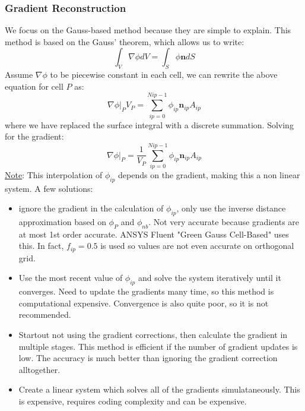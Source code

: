 \documentclass[11pt]{article}
\begin{document}
\subsubsection{Gradient Reconstruction}
\label{sec:orgfef4be6}
We focus on the Gauss-based method because they are simple to explain. This method is based on the Gauss'
theorem, which allows us to write:
\begin{equation*}
\int_{V} \nabla \phi dV = \int_{S} \phi \textbf{n} dS
\end{equation*}
Assume \(\nabla \phi\) to be piecewise constant in each cell, we can rewrite the above equation for cell
\(P\) as:
\begin{equation*}
\nabla \phi \biggr\rvert_P V_P = \sum_{ip=0}^{N{ip}-1} \phi_{ip}\textbf{n}_{ip}A_{ip}
\end{equation*}
where we have replaced the surface integral with a discrete summation. Solving for the gradient:
\begin{equation*}
\nabla \phi \biggr\rvert_P = \frac{1}{V_P}\sum_{ip=0}^{N{ip}-1} \phi_{ip}\textbf{n}_{ip}A_{ip}
\end{equation*}
\uline{Note}:
This interpolation of \(\phi_{ip}\) depends on the gradient, making this a non linear system.
A few solutions:
\begin{itemize}
\item ignore the gradient in the calculation of \(\phi_{ip}\), only use the inverse distance approximation
based on \(\phi_P\) and \(\phi_{nb}\). Not very accurate because gradients are at most 1st order
accurate. ANSYS Fluent "Green Gauss Cell-Based" uses this.  In fact, \(f_{ip} = 0.5\) is used so
values are not even accurate on orthogonal grid.
\item Use the most recent value of \(\phi_{ip}\) and solve the system iteratively until it converges. Need to
update the gradients many time, so this method is computational expensive. Convergence is also quite poor,
so it is not recommended.
\item Startout not using the gradient corrections, then calculate the gradient in multiple stages. This method
is efficient if the number of gradient updates is low. The accuracy is much better than ignoring the
gradient correction alltogether.
\item Create a linear system which solves all of the gradients simulataneously. This is expensive, requires
coding complexity and can be expensive.
\end{itemize}
\end{document}
